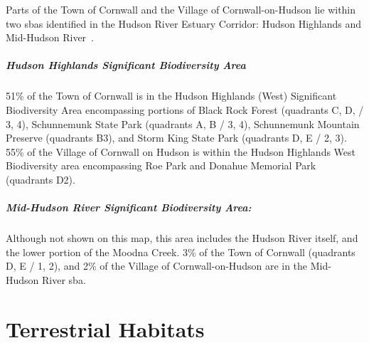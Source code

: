 Parts of the Town of Cornwall and the Village of Cornwall-on-Hudson lie within
two \gls{sba}s identified in the Hudson River Estuary Corridor: Hudson
Highlands and Mid-Hudson River~\citep{penhollow2006}.
\paragraph{\textit{Hudson Highlands Significant Biodiversity Area}}51\% of the 
Town of Cornwall is in the Hudson Highlands (West) Significant Biodiversity 
Area encompassing portions of Black Rock Forest (quadrants C, D, / 3, 4), 
Schunnemunk State Park (quadrants A, B / 3, 4), Schunnemunk Mountain Preserve 
(quadrants B3), and Storm King State Park (quadrants D, E / 2, 3). 55\% of the 
Village of Cornwall on Hudson is within the Hudson Highlands West Biodiversity 
area encompassing Roe Park and Donahue Memorial Park (quadrants D2). 

\paragraph{\textit{Mid-Hudson River Significant Biodiversity Area:}} Although not 
shown on this map, this area includes the Hudson River itself, and the lower 
portion of the Moodna Creek. 3\% of the Town of Cornwall (quadrants D, E / 1, 
2), and 2\% of the Village of Cornwall-on-Hudson are in the Mid-Hudson River 
\gls{sba}.

\label{map:aok}
\chapter{Terrestrial Habitats}\label{subsec:terrestrialhabitats}
